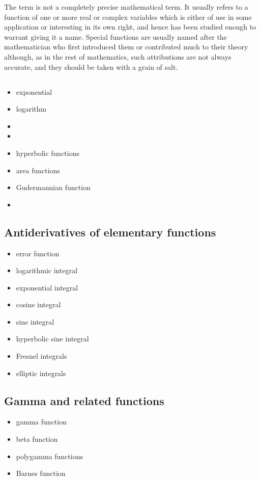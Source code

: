 \documentclass[12pt]{article}
\begin{document}
The term  is not a completely precise mathematical term.  It usually refers to a function of one or more real or complex variables which is either of use in some application or interesting in its own right, and hence has been studied enough to warrant giving it a name.  Special functions are usually named after the mathematician who first introduced them or contributed much to their theory although, as in the rest of mathematics, such attributions are not always accurate, and they should be taken with a grain of salt.

\subsection{}
\begin{itemize}
\item exponential
\item logarithm
\item {}
\item {}
\item hyperbolic functions
\item area functions
\item Gudermannian function
\item {}

\end{itemize}

\subsection{Antiderivatives of elementary functions}
\begin{itemize}
\item error function
\item logarithmic integral
\item exponential integral
\item cosine integral
\item sine integral
\item hyperbolic sine integral
\item Fresnel integrals
\item elliptic integrals
\end{itemize}

\subsection{Gamma and related functions}
\begin{itemize}
\item gamma function
\item beta function
\item polygamma functions
\item Barnes function
\end{itemize}
\end{document}
